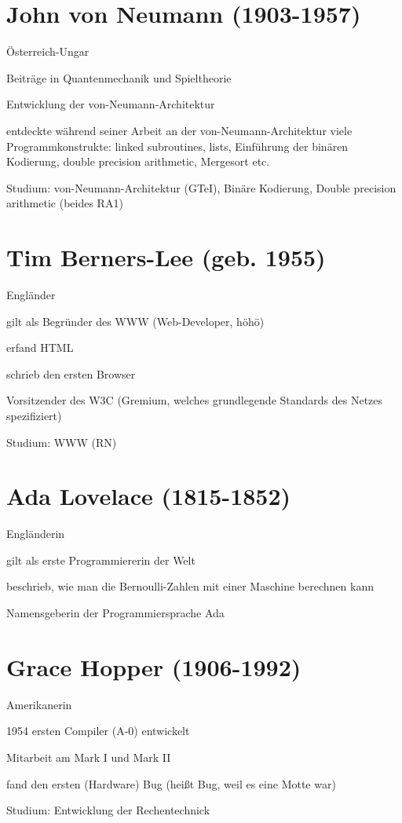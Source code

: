 \documentclass[a4paper,12pt]{report}
\begin{document}
\section{John von Neumann (1903-1957)}
\begin{itemize*}
\item Österreich-Ungar
\item Beiträge in Quantenmechanik und Spieltheorie
\item Entwicklung der von-Neumann-Architektur
\item entdeckte während seiner Arbeit an der von-Neumann-Architektur viele Programmkonstrukte: linked subroutines, lists, Einführung der binären Kodierung, double precision arithmetic, Mergesort etc.
\item Studium: von-Neumann-Architektur (GTeI), Binäre Kodierung, Double precision arithmetic (beides RA1)
\end{itemize*}

\section{Tim Berners-Lee (geb. 1955)}
\begin{itemize*}
\item Engländer
\item gilt als Begründer des WWW (Web-Developer, höhö)
\item erfand HTML
\item schrieb den ersten Browser
\item Vorsitzender des W3C (Gremium, welches grundlegende Standards des Netzes spezifiziert)
\item Studium: WWW (RN)
\end{itemize*}

\section{Ada Lovelace (1815-1852)}
\begin{itemize*}
\item Engländerin
\item gilt als erste Programmiererin der Welt
\item beschrieb, wie man die Bernoulli-Zahlen mit einer Maschine berechnen kann
\item Namensgeberin der Programmiersprache Ada
\end{itemize*}

\section{Grace Hopper (1906-1992)}
\begin{itemize*}
\item Amerikanerin
\item 1954 ersten Compiler (A-0) entwickelt
\item Mitarbeit am Mark I und Mark II
\item fand den ersten (Hardware) Bug (heißt Bug, weil es eine Motte war)
\item Studium: Entwicklung der Rechentechnick
\end{itemize*}
\end{document}
